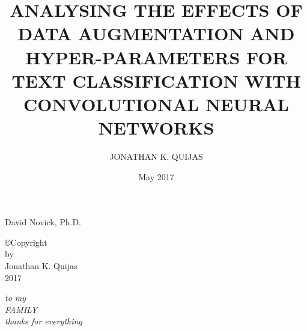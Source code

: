 \documentclass[12pt]{report}
\begin{document}

\setcounter{tocdepth}{2}


\title{ANALYSING THE EFFECTS OF DATA AUGMENTATION AND HYPER-PARAMETERS FOR TEXT CLASSIFICATION WITH CONVOLUTIONAL NEURAL NETWORKS}

\author{JONATHAN K. QUIJAS}
\date{May 2017}

                 {David Novick, Ph.D.}


\makesigpage

\begin{CenteredPage}
\copyright Copyright\\[0.2in]
by\\[0.2in]
Jonathan K. Quijas\\[0.2in]
2017
\end{CenteredPage}

\begin{CenteredPage}
{\it to my\\[0.2in]
FAMILY\\[0.2in]
thanks for everything}
\end{CenteredPage}

\maketitlepage
\end{document}
